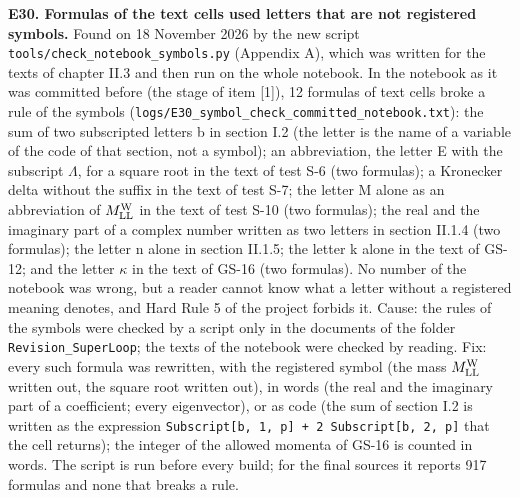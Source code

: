 \documentclass[
  10pt,
]{article}
\begin{document}
\textbf{E30. Formulas of the text cells used letters that are not
registered symbols.} Found on 18 November 2026 by the new script
\texttt{tools/check\_notebook\_symbols.py} (Appendix A), which was
written for the texts of chapter II.3 and then run on the whole
notebook. In the notebook as it was committed before (the stage of item
{[}1{]}), 12 formulas of text cells broke a rule of the symbols
(\texttt{logs/E30\_symbol\_check\_committed\_notebook.txt}): the sum of
two subscripted letters b in section I.2 (the letter is the name of a
variable of the code of that section, not a symbol); an abbreviation,
the letter E with the subscript \(\Lambda\), for a square root in the
text of test S-6 (two formulas); a Kronecker delta without the suffix in
the text of test S-7; the letter M alone as an abbreviation of
\(M^{\rm W}_{\rm LL}\) in the text of test S-10 (two formulas); the real
and the imaginary part of a complex number written as two letters in
section II.1.4 (two formulas); the letter n alone in section II.1.5; the
letter k alone in the text of GS-12; and the letter \(\kappa\) in the
text of GS-16 (two formulas). No number of the notebook was wrong, but a
reader cannot know what a letter without a registered meaning denotes,
and Hard Rule 5 of the project forbids it. Cause: the rules of the
symbols were checked by a script only in the documents of the folder
\texttt{Revision\_SuperLoop}; the texts of the notebook were checked by
reading. Fix: every such formula was rewritten, with the registered
symbol (the mass \(M^{\rm W}_{\rm LL}\) written out, the square root
written out), in words (the real and the imaginary part of a
coefficient; every eigenvector), or as code (the sum of section I.2 is
written as the expression
\texttt{Subscript{[}b,\ 1,\ p{]}\ +\ 2\ Subscript{[}b,\ 2,\ p{]}} that
the cell returns); the integer of the allowed momenta of GS-16 is
counted in words. The script is run before every build; for the final
sources it reports 917 formulas and none that breaks a rule.
\end{document}
